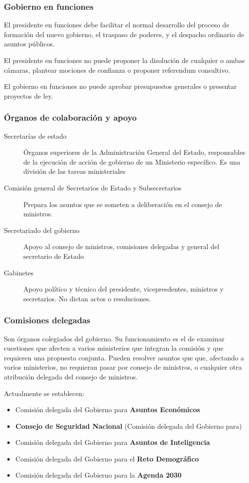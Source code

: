     \subsubsection{Gobierno en funciones}
        El presidente en funciones debe facilitar el normal desarrollo del proceso de formación del nuevo gobierno, el traspaso de poderes, y el despacho ordinario de asuntos públicos.

        El presidente en funciones no puede proponer la disolución de cualquier o ambas cámaras, plantear mociones de confianza o proponer referendum consultivo.

        El gobierno en funciones no puede aprobar presupuestos generales o presentar proyectos de ley.
    \subsubsection{Órganos de colaboración y apoyo}
        \begin{description}
            \item[Secretarías de estado] Órganos superiores de la Administración General del Estado, responsables de la ejecución de acción de gobierno de un Ministerio específico. Es una división de las tareas ministeriales
            \item[Comisión general de Secretarios de Estado y Subsecretarios] Prepara los asuntos que se someten a deliberación en el consejo de ministros. 
            \item[Secretariado del gobierno] Apoyo al consejo de ministros, comisiones delegadas y general del secretario de Estado
            \item[Gabinetes] Apoyo político y técnico del presidente, vicepresdentes, ministros y secretarios. No dictan actos o resoluciones.
        \end{description}
    \subsubsection{Comisiones delegadas}
        Son órganos colegiados del gobierno. Su funcionamiento es el de examinar cuestiones que afecten a varios ministerios que integran la comisión y que requieren una propuesta conjunta. Pueden resolver asuntos que que, afectando a varios ministerios, no requieran pasar por consejo de ministros, o cualquier otra atribución delegada del consejo de ministros.

        Actualmente  se establecen:
        \begin{itemize}
            \item Comisión delegada del Gobierno para \textbf{Asuntos Económicos}
            \item \textbf{Consejo de Seguridad Nacional} (Comisión delegada del Gobierno para)
            \item Comisión delegada del Gobierno para \textbf{Asuntos de Inteligencia}
            \item Comisión delegada del Gobierno para el \textbf{Reto Demográfico}
            \item Comisión delegada del Gobierno para la \textbf{Agenda 2030}
        \end{itemize}

